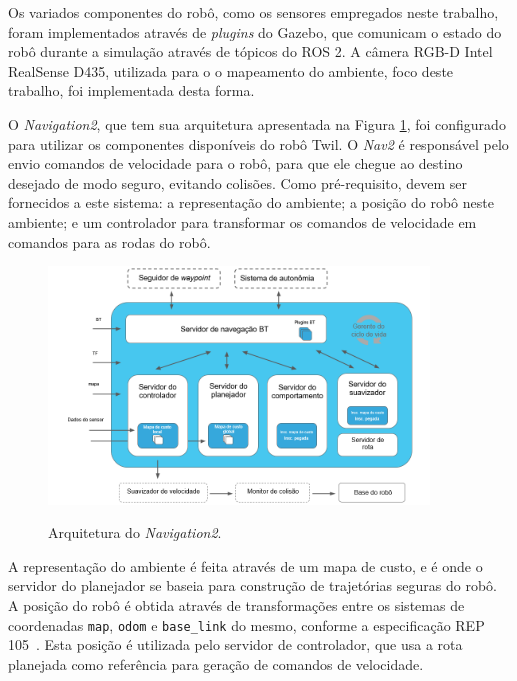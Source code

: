 \documentclass[repeatfields,xlists,xpacks,oneside,yearsonly]{ufrgscca}
\begin{document}
Os variados componentes do robô, como os sensores empregados neste
trabalho, foram implementados através de \textit{plugins} do Gazebo,
que comunicam o estado do robô durante a simulação através de tópicos
do ROS 2. A câmera RGB-D Intel RealSense D435, utilizada para o o
mapeamento do ambiente, foco deste trabalho, foi implementada desta
forma.

O \textit{Navigation2}, que tem sua arquitetura apresentada na Figura
\ref{fig:nav2_arc}, foi configurado para utilizar os componentes
disponíveis do robô Twil. O \textit{Nav2} é responsável pelo envio
comandos de velocidade para o robô, para que ele chegue ao destino
desejado de modo seguro, evitando colisões. Como pré-requisito, devem
ser fornecidos a este sistema: a representação do ambiente; a posição
do robô neste ambiente; e um controlador para transformar os comandos
de velocidade em comandos para as rodas do robô.

\begin{figure}[h]
    {
        \centering
        \caption{Arquitetura do \textit{Navigation2}.}
        \label{fig:nav2_arc}
        \includegraphics[width=0.9\textwidth]{nav2_architecture_trad.png}\\
    }
    {} %
\end{figure}

A representação do ambiente é feita através de um mapa de custo, e é
onde o servidor do planejador se baseia para construção de
trajetórias seguras do robô. A posição do robô é obtida através de
transformações entre os sistemas de coordenadas \texttt{map},
\texttt{odom} e \texttt{base\_link} do mesmo, conforme a
especificação REP 105~\cite{rep_105}. Esta posição é utilizada pelo
servidor de controlador, que usa a rota planejada como referência
para geração de comandos de velocidade.
\end{document}

